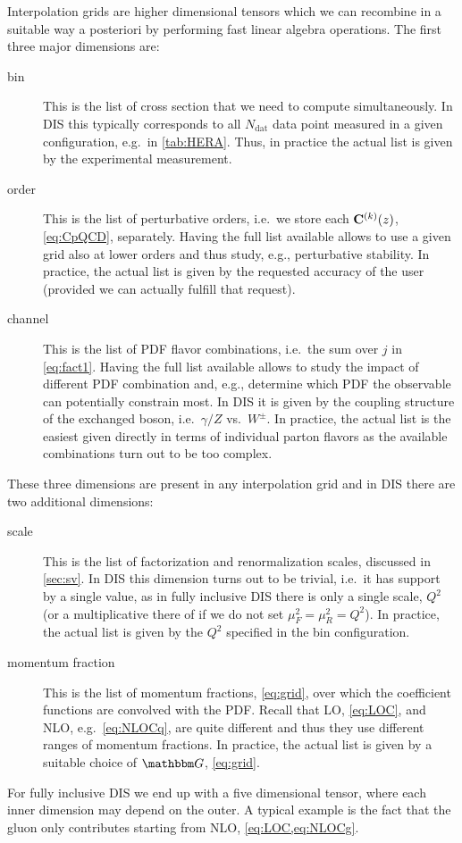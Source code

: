 Interpolation grids are higher dimensional tensors which we can recombine in a suitable way a posteriori by performing fast linear algebra operations.
The first three major dimensions are:
\begin{description}
    \item[bin] This is the list of cross section that we need to compute simultaneously.
        In DIS this typically corresponds to all $N_\text{dat}$ data point measured in a given configuration, e.g.\ in \cref{tab:HERA}.
        Thus, in practice the actual list is given by the experimental measurement.
    \item[order] This is the list of perturbative orders, i.e.\ we store each $\vb C^{(k)}(z)$, \cref{eq:CpQCD}, separately.
        Having the full list available allows to use a given grid also at lower orders and thus study, e.g., perturbative stability.
        In practice, the actual list is given by the requested accuracy of the user (provided we can actually fulfill that request).
    \item[channel] This is the list of PDF flavor combinations, i.e.\ the sum over $j$ in \cref{eq:fact1}.
        Having the full list available allows to study the impact of different PDF combination and, e.g., determine which PDF the observable can potentially constrain most.
        In DIS it is given by the coupling structure of the exchanged boson, i.e.\ $\gamma/Z$ vs.\ $W^\pm$.
        In practice, the actual list is the easiest given directly in terms of individual parton flavors as the available combinations turn out to be too complex.
\end{description}

These three dimensions are present in any interpolation grid and in DIS there are two additional dimensions:
\begin{description}
    \item[scale] This is the list of factorization and renormalization scales, discussed in \cref{sec:sv}.
        In DIS this dimension turns out to be trivial, i.e.\ it has support by a single value, as in fully inclusive DIS there is only a single scale, $Q^2$ (or a multiplicative there of if we do not set $\mu_F^2 = \mu_R^2 = Q^2$).
        In practice, the actual list is given by the $Q^2$ specified in the bin configuration.
    \item[momentum fraction] This is the list of momentum fractions, \cref{eq:grid}, over which the coefficient functions are convolved with the PDF.
        Recall that LO, \cref{eq:LOC}, and NLO, e.g.\ \cref{eq:NLOCq}, are quite different and thus they use different ranges of momentum fractions.
        In practice, the actual list is given by a suitable choice of $\mathbbm G$, \cref{eq:grid}.
\end{description}

For fully inclusive DIS we end up with a five dimensional tensor, where each inner dimension may depend on the outer.
A typical example is the fact that the gluon only contributes starting from NLO, \cref{eq:LOC,eq:NLOCg}.
